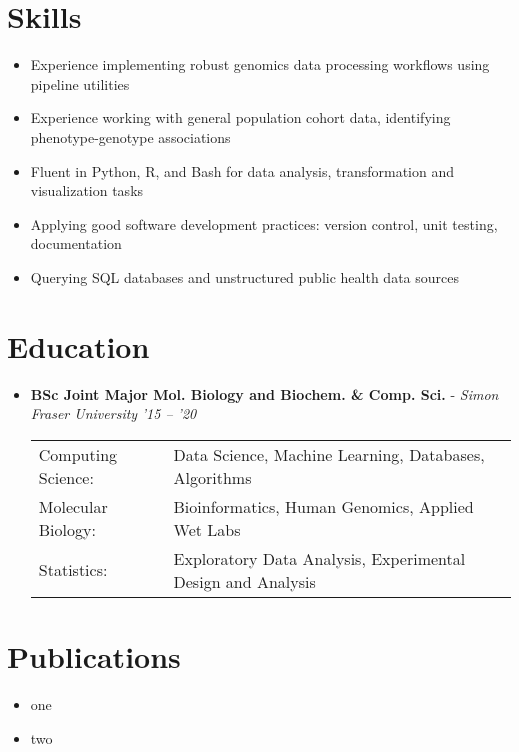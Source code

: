 \documentclass{article}
\newcommand{\customitem}{\item[] \hspace{-.85cm}}
\newcommand{\experienceheader}[3]{\customitem \textbf{#1} - \textit{#2} \hfill \textit{#3}}
\newcommand{\customsection}[1]{\section*{#1} \vspace{-.3cm} \hrulefill}
\begin{document}
\customsection{Skills}
\begin{itemize}
  \customitem Experience implementing robust genomics data processing workflows using pipeline utilities
  \customitem Experience working with general population cohort data, identifying phenotype-genotype associations
  \customitem Fluent in Python, R, and Bash for data analysis, transformation and visualization tasks
  \customitem Applying good software development practices: version control, unit testing, documentation
  \customitem Querying SQL databases and unstructured public health data sources
\end{itemize}

\customsection{Education}
\begin{itemize}
\experienceheader{BSc Joint Major Mol. Biology and Biochem. \& Comp. Sci.}{Simon Fraser University}{'15 -- '20}
\begin{tabular}{ l l }
    Computing Science: & Data Science, Machine Learning, Databases, Algorithms \\
    Molecular Biology: & Bioinformatics, Human Genomics, Applied Wet Labs \\
    Statistics: & Exploratory Data Analysis, Experimental Design and Analysis
  \end{tabular}
\end{itemize}

\customsection{Publications}
\begin{itemize}
  \customitem one
  \customitem two
\end{itemize}
\end{document}

